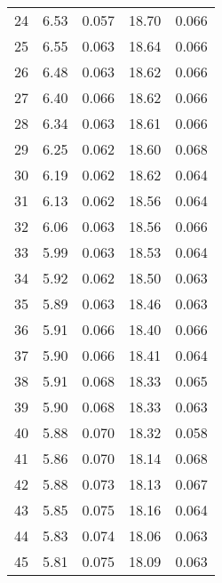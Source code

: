 \begin{table}
\begin{tabular}{c|ll|ll}
24 & 6.53 & 0.057 & 18.70 & 0.066 \\
25 & 6.55 & 0.063 & 18.64 & 0.066 \\
26 & 6.48 & 0.063 & 18.62 & 0.066 \\
27 & 6.40 & 0.066 & 18.62 & 0.066 \\
28 & 6.34 & 0.063 & 18.61 & 0.066 \\
29 & 6.25 & 0.062 & 18.60 & 0.068 \\
30 & 6.19 & 0.062 & 18.62 & 0.064 \\
31 & 6.13 & 0.062 & 18.56 & 0.064 \\
32 & 6.06 & 0.063 & 18.56 & 0.066 \\
33 & 5.99 & 0.063 & 18.53 & 0.064 \\
34 & 5.92 & 0.062 & 18.50 & 0.063 \\
35 & 5.89 & 0.063 & 18.46 & 0.063 \\
36 & 5.91 & 0.066 & 18.40 & 0.066 \\
37 & 5.90 & 0.066 & 18.41 & 0.064 \\
38 & 5.91 & 0.068 & 18.33 & 0.065 \\
39 & 5.90 & 0.068 & 18.33 & 0.063 \\
40 & 5.88 & 0.070 & 18.32 & 0.058 \\
41 & 5.86 & 0.070 & 18.14 & 0.068 \\
42 & 5.88 & 0.073 & 18.13 & 0.067 \\
43 & 5.85 & 0.075 & 18.16 & 0.064 \\
44 & 5.83 & 0.074 & 18.06 & 0.063 \\
45 & 5.81 & 0.075 & 18.09 & 0.063 \\
               \hline
        \end{tabular}
    \end{table}
    \clearpage

